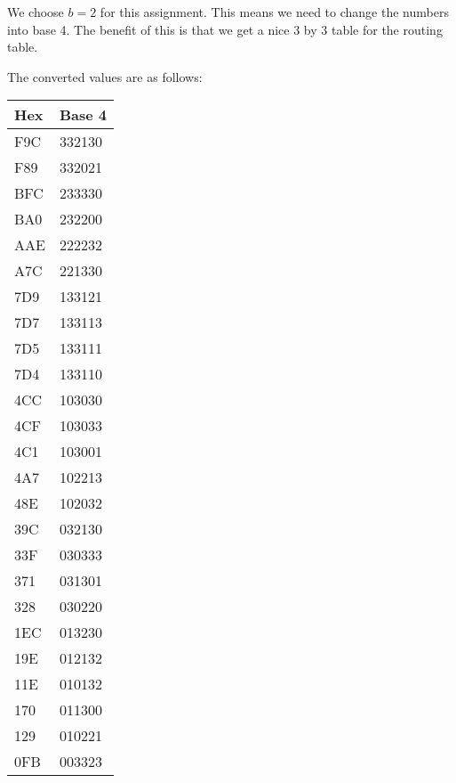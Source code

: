 \documentclass{article}
\begin{document}
We choose $b = 2$ for this assignment. This means we need to change the numbers into base 4. The benefit of this is that we get a nice 3 by 3 table for the routing table.

The converted values are as follows:
\begin{table}[ht!]
    \begin{center}
    \begin{tabular}{| l | l |}
    \hline
    \bf{Hex}  & \bf{Base 4} \\
    \hline
    F9C         & 332130 \\
    \hline
    F89         & 332021 \\
    \hline
    BFC         & 233330 \\
    \hline
    BA0         & 232200 \\
    \hline
    AAE         & 222232 \\
    \hline
    A7C         & 221330 \\
    \hline
    7D9         & 133121 \\
    \hline
    7D7         & 133113 \\
    \hline
    7D5         & 133111 \\
    \hline
    7D4         & 133110 \\
    \hline
    4CC         & 103030 \\
    \hline
    4CF         & 103033 \\
    \hline
    4C1         & 103001 \\
    \hline
    4A7         & 102213 \\
    \hline
    48E         & 102032 \\
    \hline
    39C         & 032130 \\
    \hline
    33F         & 030333 \\
    \hline
    371         & 031301 \\
    \hline
    328         & 030220 \\
    \hline
    1EC         & 013230 \\
    \hline
    19E         & 012132 \\
    \hline
    11E         & 010132 \\
    \hline
    170         & 011300 \\
    \hline
    129         & 010221 \\
    \hline
    0FB         & 003323 \\
    \hline
    \end{tabular}
    \end{center}
\end{table}
\end{document}
